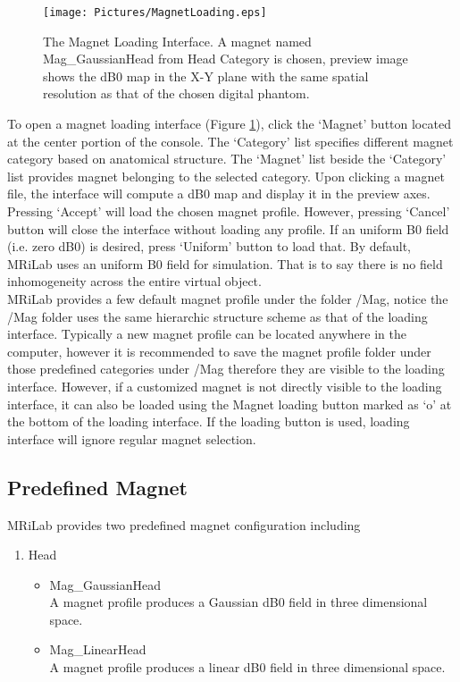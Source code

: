 \documentclass{book}%
\begin{document}
\begin{figure}[htbp]
	\centering
		\texttt{[image: Pictures/MagnetLoading.eps]}
	\caption{The Magnet Loading Interface. A magnet named Mag\_GaussianHead from Head Category is chosen, preview image shows the dB0 map in the X-Y plane with the same spatial resolution as that of the chosen digital phantom.}
	\label{fig:MagnetLoading}
\end{figure}

To open a magnet loading interface (Figure \ref{fig:MagnetLoading}), click the `Magnet' button located at the center portion of the console. The `Category' list specifies different magnet category based on anatomical structure. The `Magnet' list beside the `Category' list provides magnet belonging to the selected category. Upon clicking a magnet file, the interface will compute a dB0 map and display it in the preview axes. Pressing `Accept' will load the chosen magnet profile. However, pressing `Cancel' button will close the interface without loading any profile. If an uniform B0 field (i.e. zero dB0) is desired, press `Uniform' button to load that. By default, MRiLab uses an uniform B0 field for simulation. That is to say there is no field inhomogeneity across the entire virtual object. \\

MRiLab provides a few default magnet profile under the folder /Mag, notice the /Mag folder uses the same hierarchic structure scheme as that of the loading interface. Typically a new magnet profile can be located anywhere in the computer, however it is recommended to save the magnet profile folder under those predefined categories under /Mag therefore they are visible to the loading interface. However, if a customized magnet is not directly visible to the loading interface, it can also be loaded using the Magnet loading button marked as `o' at the bottom of the loading interface. If the loading button is used, loading interface will ignore regular magnet selection.

\subsection{Predefined Magnet}

MRiLab provides two predefined magnet configuration including

\begin{enumerate}
		\item Head
		\begin{itemize}
			\item Mag\_GaussianHead \\
			A magnet profile produces a Gaussian dB0 field in three dimensional space.
			\item Mag\_LinearHead \\
			A magnet profile produces a linear dB0 field in three dimensional space.
		\end{itemize}

\end{enumerate}
\end{document}
